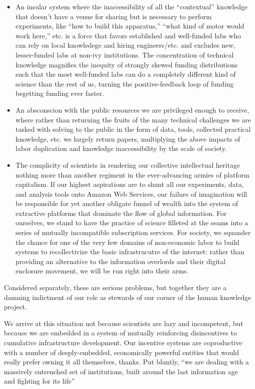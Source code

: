 \documentclass[10pt]{article}
\begin{document}
\begin{multicols}{2}
\begin{itemize}
\item
  An insular system where the inaccessibility of all the ``contextual''
  knowledge \cite{woolKnowledgeNetworksHow2020, barleyBackroomsScienceWork1994}  that doesn't have a venue for
  sharing but is necessary to perform experiments, like ``how to build
  this apparatus,'' ``what kind of motor would work here,'' etc. is a
  force that favors established and well-funded labs who can rely on
  local knowledege and hiring engineers/etc. and excludes new,
  lesser-funded labs at non-ivy institutions. The concentration of
  technical knowledge magnifies the inequity of strongly skewed funding
  distributions such that the most well-funded labs can do a completely
  different kind of science than the rest of us, turning the
  positive-feedback loop of funding begetting funding ever faster.
\item
  An absconscion with the public resources we are privileged enough to
  receive, where rather than returning the fruits of the many technical
  challenges we are tasked with solving to the public in the form of
  data, tools, collected practical knowledge, etc. we largely return
  papers, multiplying the above impacts of labor duplication and
  knowledge inaccessibility by the scale of society.
\item
  The complicity of scientists in rendering our collective intellectual
  heritage nothing more than another regiment in the ever-advancing
  armies of platform capitalism. If our highest aspirations are to shunt
  all our experiments, data, and analysis tools onto Amazon Web
  Services, our failure of imagination will be responsible for yet
  another obligate funnel of wealth into the system of extractive
  platforms that dominate the flow of global information. For ourselves,
  we stand to have the practice of science filleted at the seams into a
  series of mutually incompatible subscription services. For society, we
  squander the chance for one of the very few domains of non-economic
  labor to build systems to recollectivize the basic infrastrucutre of
  the internet: rather than providing an alternative to the information
  overlords and their digital enclosure movement, we will be run right
  into their arms.
\end{itemize}

Considered separately, these are serious problems, but together they are
a damning indictment of our role as stewards of our corner of the human
knowledge project.

We arrive at this situation not because scientists are lazy and
incompetent, but because we are embedded in a system of mutually
reinforcing disincentives to cumulative infrastructure development. Our
incentive systems are coproductive with a number of deeply-embedded,
economically powerful entities that would really prefer owning it all
themselves, thanks. Put bluntly, ``we are dealing with a massively
entrenched set of institutions, built around the last information age
and fighting for its life'' \cite{bowkerInformationInfrastructureStudies2010} 


\end{multicols}
\end{document}

